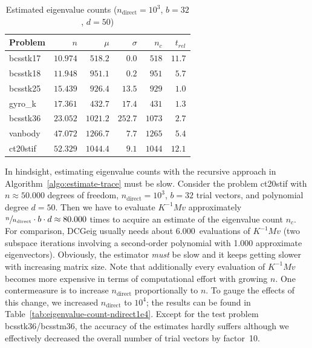 \documentclass[%
	paper=a4,
	fontsize=10pt,
	DIV11,BCOR10mm,
	numbers=noenddot,
	abstract=yes
]{scrartcl}
\theoremstyle{definition}
\begin{document}
\begin{table}
	\centering
	\begin{tabular}{lrrrrr}
		Problem & $n$ & $\mu$ & $\sigma$ & $n_c$ & $t_{rel}$ \\
		\toprule
		bcsstk17 & $10.974$ &  $518.2$ &   $0.0$ &  $518$ & $11.7$ \\
		bcsstk18 & $11.948$ &  $951.1$ &   $0.2$ &  $951$ &  $5.7$ \\
		bcsstk25 & $15.439$ &  $926.4$ &  $13.5$ &  $929$ &  $1.0$ \\
		gyro\_k  & $17.361$ &  $432.7$ &  $17.4$ &  $431$ &  $1.3$ \\
		bcsstk36 & $23.052$ & $1021.2$ & $252.7$ & $1073$ &  $2.7$ \\
		vanbody  & $47.072$ & $1266.7$ &   $7.7$ & $1265$ &  $5.4$ \\
		ct20stif & $52.329$ & $1044.4$ &   $9.1$ & $1044$ & $12.1$
	\end{tabular}
	\caption{Estimated eigenvalue counts ($n_{\text{direct}} = 10^3$, $b = 32$,
	$d = 50$)}
	\label{tab:eigenvalue-count-ndirect1e3}
\end{table}

In hindsight, estimating eigenvalue counts with the recursive approach in
Algorithm~\ref{algo:estimate-trace} must be slow. Consider the problem ct20stif
with $n \approx 50.000$ degrees of freedom, $n_{\text{direct}} = 10^3$, $b = 32$
trial vectors, and polynomial degree $d = 50$. Then we have to evaluate $K^{-1}
M v$ approximately $\sfrac{n}{n_{\text{direct}}} \cdot b \cdot d \approx 80.000$
times to acquire an estimate of the eigenvalue count $n_c$. For comparison,
DCGeig usually needs about 6.000~evaluations of $K^{-1} M v$ (two subspace
iterations involving a second-order polynomial with 1.000 approximate
eigenvectors). Obviously, the estimator \emph{must} be slow and it keeps
getting slower with increasing matrix size. Note that additionally every
evaluation of $K^{-1} M v$ becomes more expensive in terms of computational
effort with growing $n$. One contermeasure is to increase $n_{\text{direct}}$
proportionally to $n$. To gauge the effects of this change, we increased
$n_{\text{direct}}$ to $10^4$; the results can be found in
Table~\ref{tab:eigenvalue-count-ndirect1e4}. Except for the test problem
bcsstk36/bcsstm36, the accuracy of the estimates hardly suffers although we
effectively decreased the overall number of trial vectors by factor~10.
\end{document}
